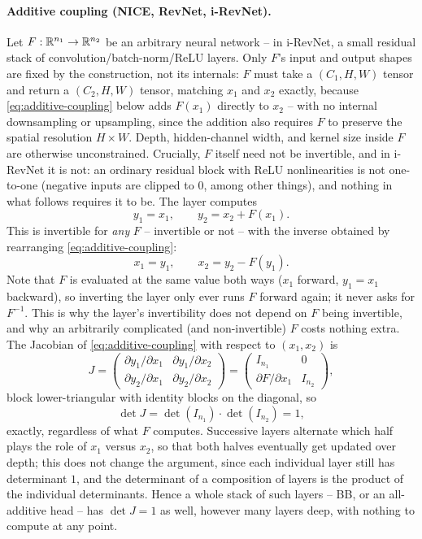 \paragraph{Additive coupling (NICE, RevNet, i-RevNet).} Let $F:\mathbb{R}^{n_1}\to\mathbb{R}^{n_2}$ be an arbitrary
neural network -- in i-RevNet, a small residual stack of convolution/batch-norm/ReLU layers. Only $F$'s
input and output shapes are fixed by the construction, not its internals: $F$ must take a $(C_1,H,W)$
tensor and return a $(C_2,H,W)$ tensor, matching $x_1$ and $x_2$ exactly, because \cref{eq:additive-coupling}
below adds $F(x_1)$ directly to $x_2$ -- with no internal downsampling or upsampling, since the addition
also requires $F$ to preserve the spatial resolution $H\times W$. Depth, hidden-channel width, and kernel
size inside $F$ are otherwise unconstrained. Crucially, $F$ itself need not be invertible, and in
i-RevNet it is not: an ordinary residual block with ReLU nonlinearities is not one-to-one (negative inputs
are clipped to $0$, among other things), and nothing in what follows requires it to be. The layer
computes
\begin{equation}
y_1=x_1,\qquad y_2=x_2+F(x_1).
\label{eq:additive-coupling}
\end{equation}
This is invertible for \emph{any} $F$ -- invertible or not -- with the inverse obtained by rearranging
\cref{eq:additive-coupling}:
\[
x_1=y_1,\qquad x_2=y_2-F(y_1).
\]
Note that $F$ is evaluated at the same value both ways ($x_1$ forward, $y_1=x_1$ backward), so inverting
the layer only ever runs $F$ forward again; it never asks for $F^{-1}$. This is why the layer's
invertibility does not depend on $F$ being invertible, and why an arbitrarily complicated (and
non-invertible) $F$ costs nothing extra. The Jacobian of \cref{eq:additive-coupling} with respect to
$(x_1,x_2)$ is
\[
J=\begin{pmatrix}
\partial y_1/\partial x_1 & \partial y_1/\partial x_2\\[2pt]
\partial y_2/\partial x_1 & \partial y_2/\partial x_2
\end{pmatrix}
=\begin{pmatrix}
I_{n_1} & 0\\[2pt]
\partial F/\partial x_1 & I_{n_2}
\end{pmatrix},
\]
block lower-triangular with identity blocks on the diagonal, so
\[
\det J=\det(I_{n_1})\cdot\det(I_{n_2})=1,
\]
exactly, regardless of what $F$ computes. Successive layers alternate which half plays the role of $x_1$
versus $x_2$, so that both halves eventually get updated over depth; this does not change the argument,
since each individual layer still has determinant $1$, and the determinant of a composition of layers is
the product of the individual determinants. Hence a whole stack of such layers -- BB, or an all-additive
head -- has $\det J=1$ as well, however many layers deep, with nothing to compute at any point.

